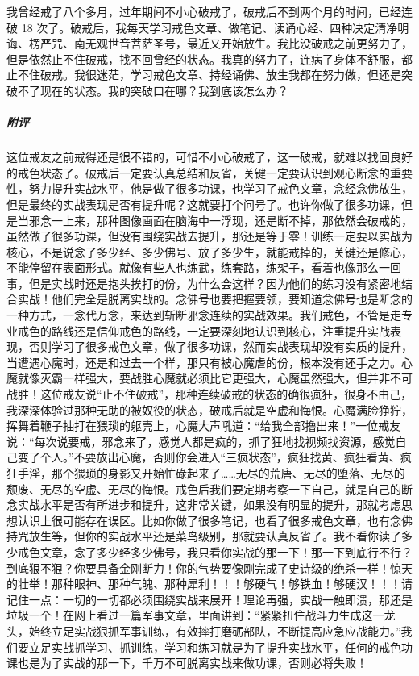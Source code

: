 \begin{case}
    我曾经戒了八个多月，过年期间不小心破戒了，破戒后不到两个月的时间，已经连破 18 次了。破戒后，我每天学习戒色文章、做笔记、读诵心经、四种决定清净明诲、楞严咒、南无观世音菩萨圣号，最近又开始放生。我比没破戒之前更努力了，但是依然止不住破戒，找不回曾经的状态。我真的努力了，连病了身体不舒服，都止不住破戒。我很迷茫，学习戒色文章、持经诵佛、放生我都在努力做，但还是突破不了现在的状态。我的突破口在哪？我到底该怎么办？
    \subparagraph{附评} 这位戒友之前戒得还是很不错的，可惜不小心破戒了，这一破戒，就难以找回良好的戒色状态了。破戒后一定要认真总结和反省，关键一定要认识到观心断念的重要性，努力提升实战水平，他是做了很多功课，也学习了戒色文章，念经念佛放生，但是最终的实战表现是否有提升呢？这就要打个问号了。也许你做了很多功课，但是当邪念一上来，那种图像画面在脑海中一浮现，还是断不掉，那依然会破戒的，虽然做了很多功课，但没有围绕实战去提升，那还是等于零！训练一定要以实战为核心，不是说念了多少经、多少佛号、放了多少生，就能戒掉的，关键还是修心，不能停留在表面形式。就像有些人也练武，练套路，练架子，看着也像那么一回事，但是实战时还是抱头挨打的份，为什么会这样？因为他们的练习没有紧密地结合实战！他们完全是脱离实战的。念佛号也要把握要领，要知道念佛号也是断念的一种方式，一念代万念，来达到斩断邪念连续的实战效果。我们戒色，不管是走专业戒色的路线还是信仰戒色的路线，一定要深刻地认识到核心，注重提升实战表现，否则学习了很多戒色文章，做了很多功课，然而实战表现却没有实质的提升，当遭遇心魔时，还是和过去一个样，那只有被心魔虐的份，根本没有还手之力。心魔就像灭霸一样强大，要战胜心魔就必须比它更强大，心魔虽然强大，但并非不可战胜！这位戒友说“止不住破戒”，那种连续破戒的状态的确很疯狂，很身不由己，我深深体验过那种无助的被奴役的状态，破戒后就是空虚和悔恨。心魔满脸狰狞，挥舞着鞭子抽打在猥琐的躯壳上，心魔大声吼道：“给我全部撸出来！”一位戒友说：“每次说要戒，邪念来了，感觉人都是疯的，抓了狂地找视频找资源，感觉自己变了个人。”不要放出心魔，否则你会进入“三疯状态”，疯狂找黄、疯狂看黄、疯狂手淫，那个猥琐的身影又开始忙碌起来了……无尽的荒唐、无尽的堕落、无尽的颓废、无尽的空虚、无尽的悔恨。戒色后我们要定期考察一下自己，就是自己的断念实战水平是否有所进步和提升，这非常关键，如果没有明显的提升，那就考虑思想认识上很可能存在误区。比如你做了很多笔记，也看了很多戒色文章，也有念佛持咒放生等，但你的实战水平还是菜鸟级别，那就要认真反省了。我不看你读了多少戒色文章，念了多少经多少佛号，我只看你实战的那一下！那一下到底行不行？到底狠不狠？你要具备金刚断力！你的气势要像刚完成了史诗级的绝杀一样！惊天的壮举！那种眼神、那种气魄、那种犀利！！！够硬气！够铁血！够硬汉！！！请记住一点：一切的一切都必须围绕实战来展开！理论再强，实战一触即溃，那还是垃圾一个！在网上看过一篇军事文章，里面讲到：“紧紧扭住战斗力生成这一龙头，始终立足实战狠抓军事训练，有效摔打磨砺部队，不断提高应急应战能力。”我们要立足实战抓学习、抓训练，学习和练习就是为了提升实战水平，任何的戒色功课也是为了实战的那一下，千万不可脱离实战来做功课，否则必将失败！
\end{case}

